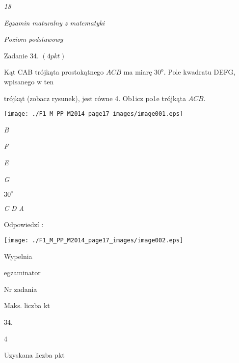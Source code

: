 \documentclass[a4paper,12pt]{article}
\begin{document}
{\it 18}

{\it Egzamin maturalny z matematyki}

{\it Poziom podstawowy}

Zadanie 34. $(4pkt)$

Kąt CAB trójkąta prostokątnego $ACB$ ma miarę $30^{\mathrm{o}}$. Pole kwadratu DEFG, wpisanego w ten

trójkąt (zobacz rysunek), jest równe 4. Ob1icz po1e trójkąta $ACB.$
\begin{center}
\texttt{[image: ./F1\_M\_PP\_M2014\_page17\_images/image001.eps]}
\end{center}
{\it B}

{\it F}

{\it E}

{\it G}

$30^{\mathrm{o}}$

{\it C D  A}

Odpowiedzí :
\begin{center}
\texttt{[image: ./F1\_M\_PP\_M2014\_page17\_images/image002.eps]}
\end{center}
Wypelnia

egzaminator

Nr zadania

Maks. liczba kt

34.

4

Uzyskana liczba pkt
\end{document}
